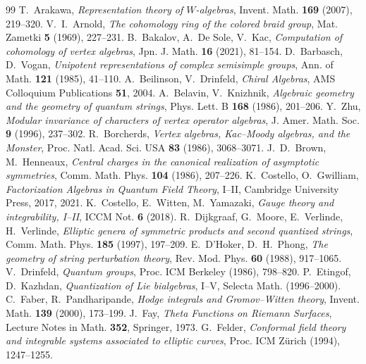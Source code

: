 \documentclass[11pt]{amsart}
\numberwithin{equation}{section}
\theoremstyle{plain}
\theoremstyle{definition}
\theoremstyle{remark}
\begin{document}
\begin{thebibliography}{99}
 T.~Arakawa,
\emph{Representation theory of $W$-algebras},
Invent. Math. \textbf{169} (2007), 219--320.
 V.~I.~Arnold,
\emph{The cohomology ring of the colored braid group},
Mat. Zametki \textbf{5} (1969), 227--231.
 B.~Bakalov, A.~De Sole, V.~Kac,
\emph{Computation of cohomology of vertex algebras},
Jpn. J. Math. \textbf{16} (2021), 81--154.
 D.~Barbasch, D.~Vogan,
\emph{Unipotent representations of complex semisimple groups},
Ann. of Math. \textbf{121} (1985), 41--110.
 A.~Beilinson, V.~Drinfeld,
\emph{Chiral Algebras},
AMS Colloquium Publications \textbf{51}, 2004.
 A.~Belavin, V.~Knizhnik,
\emph{Algebraic geometry and the geometry of quantum strings},
Phys. Lett. B \textbf{168} (1986), 201--206.
 Y.~Zhu,
\emph{Modular invariance of characters of vertex operator algebras},
J. Amer. Math. Soc. \textbf{9} (1996), 237--302.
 R.~Borcherds,
\emph{Vertex algebras, Kac--Moody algebras, and the Monster},
Proc. Natl. Acad. Sci. USA \textbf{83} (1986), 3068--3071.
 J.~D.~Brown, M.~Henneaux,
\emph{Central charges in the canonical realization of asymptotic
symmetries},
Comm. Math. Phys. \textbf{104} (1986), 207--226.
 K.~Costello, O.~Gwilliam,
\emph{Factorization Algebras in Quantum Field Theory}, I--II,
Cambridge University Press, 2017, 2021.
 K.~Costello, E.~Witten, M.~Yamazaki,
\emph{Gauge theory and integrability, I--II},
ICCM Not. \textbf{6} (2018).
 R.~Dijkgraaf, G.~Moore, E.~Verlinde,
H.~Verlinde,
\emph{Elliptic genera of symmetric products and second quantized
strings},
Comm. Math. Phys. \textbf{185} (1997), 197--209.
 E.~D'Hoker, D.~H.~Phong,
\emph{The geometry of string perturbation theory},
Rev. Mod. Phys. \textbf{60} (1988), 917--1065.
 V.~Drinfeld,
\emph{Quantum groups},
Proc. ICM Berkeley (1986), 798--820.
 P.~Etingof, D.~Kazhdan,
\emph{Quantization of Lie bialgebras}, I--V,
Selecta Math. (1996--2000).
 C.~Faber, R.~Pandharipande,
\emph{Hodge integrals and Gromov--Witten theory},
Invent. Math. \textbf{139} (2000), 173--199.
 J.~Fay,
\emph{Theta Functions on Riemann Surfaces},
Lecture Notes in Math. \textbf{352}, Springer, 1973.
 G.~Felder,
\emph{Conformal field theory and integrable systems associated to
elliptic curves},
Proc. ICM Z\"urich (1994), 1247--1255.

\end{thebibliography}
\end{document}
